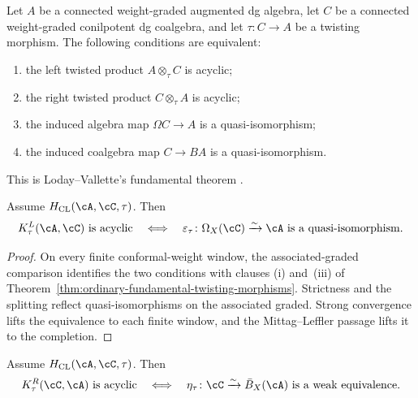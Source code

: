 \begin{theorem}
\label{thm:ordinary-fundamental-twisting-morphisms}
Let \(A\) be a connected weight-graded augmented dg algebra, let \(C\)
be a connected weight-graded conilpotent dg coalgebra, and let
\(\tau\colon C\to A\) be a twisting morphism.  The following
conditions are equivalent:
\begin{enumerate}[label=\textup{(\roman*)}]
\item the left twisted product \(A\otimes_\tau C\) is acyclic;
\item the right twisted product \(C\otimes_\tau A\) is acyclic;
\item the induced algebra map \(\Omega C\to A\) is a
 quasi-isomorphism;
\item the induced coalgebra map \(C\to BA\) is a
 quasi-isomorphism.
\end{enumerate}
This is Loday--Vallette's fundamental theorem
\cite[Theorem~2.3.2]{LodayVallette12}.
\end{theorem}

\begin{lemma}
\label{lem:twisted-product-cone-counit}
Assume \(H_{\mathrm{CL}}(\cA,\cC,\tau)\).  Then
\[
 K_\tau^L(\cA,\cC)\text{ is acyclic}
 \quad\Longleftrightarrow\quad
 \varepsilon_\tau\colon\Omega_X(\cC)\xrightarrow{\sim}\cA
 \text{ is a quasi-isomorphism}.
\]
\end{lemma}

\begin{proof}
On every finite conformal-weight window, the associated-graded
comparison identifies the two conditions with clauses
\textup{(i)} and~\textup{(iii)} of
Theorem~\ref{thm:ordinary-fundamental-twisting-morphisms}.  Strictness
and the splitting reflect quasi-isomorphisms on the associated graded.
Strong convergence lifts the equivalence to each finite window, and
the Mittag--Leffler passage lifts it to the completion.
\end{proof}

\begin{lemma}
\label{lem:twisted-product-cone-unit}
Assume \(H_{\mathrm{CL}}(\cA,\cC,\tau)\).  Then
\[
 K_\tau^R(\cC,\cA)\text{ is acyclic}
 \quad\Longleftrightarrow\quad
 \eta_\tau\colon\cC\xrightarrow{\sim}\bar B_X(\cA)
 \text{ is a weak equivalence}.
\]
\end{lemma}

